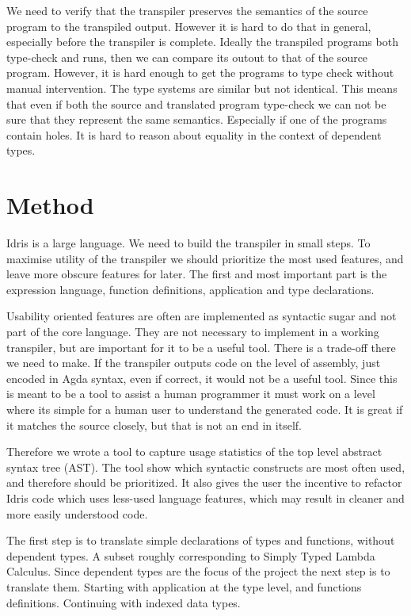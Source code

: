 \documentclass[parskip=half]{scrartcl}
\begin{document}
We need to verify that the transpiler preserves the semantics of the source
program to the transpiled output. However it is hard to do that in general,
especially before the transpiler is complete.  Ideally the transpiled programs
both type-check and runs, then we can compare its outout to that of the source
program.  However, it is hard enough to get the programs to type check without
manual intervention. The type systems are similar but not identical. This means
that even if both the source and translated program type-check we can not be
sure that they represent the same semantics.  Especially if one of the programs
contain holes. It is hard to reason about equality in the context of dependent
types.

\section{Method}
Idris is a large language. We need to build the transpiler in small steps. To
maximise utility of the transpiler we should prioritize the most used features,
and leave more obscure features for later.
The first and most important part is
the expression language, function definitions, application and type
declarations.

Usability oriented features are often are implemented as syntactic sugar and
not part of the core language. They are not necessary to implement in a working
transpiler, but are important for it to be a useful tool. There is a trade-off
there we need to make. If the transpiler outputs code on the level of
assembly, just encoded in Agda syntax, even if correct, it would not be a useful
tool.
Since this is meant to be a tool to assist a human programmer it must
work on a level where its simple for a human user to understand the generated
code. It is great if it matches the source closely, but that is not an end in
itself.


Therefore we wrote a tool to capture usage statistics of the top level abstract
syntax tree (AST). The tool show which syntactic constructs are most often
used, and therefore should be prioritized. It also gives the user the
incentive to refactor Idris code which uses less-used language features,
which may result in cleaner and more easily understood code.

The first step is to translate simple declarations of types and functions,
without dependent types. A subset roughly corresponding to Simply Typed Lambda
Calculus. Since dependent types are the focus of the project the next step is
to translate them. Starting with application at the type level, and functions
definitions. Continuing with indexed data types.
\end{document}
